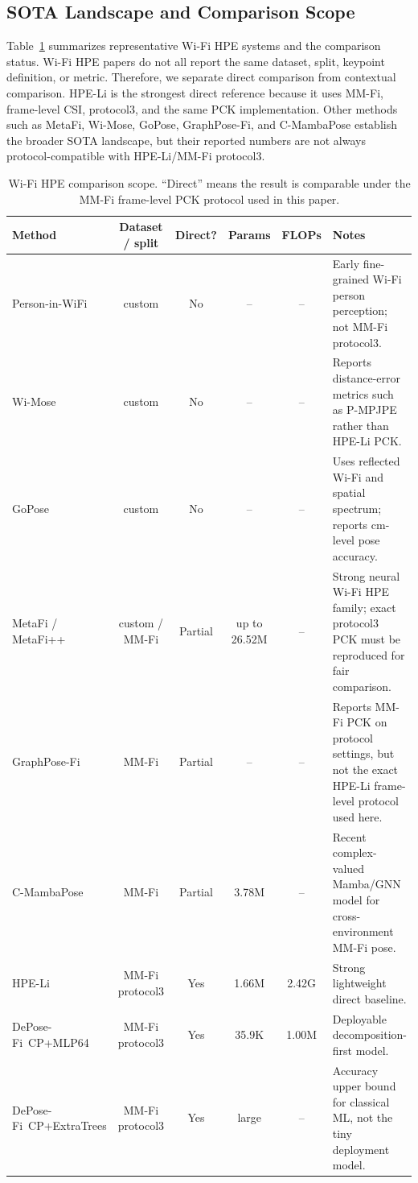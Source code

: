 \documentclass[letterpaper]{article}
\newcommand{\method}{DePose-Fi}
\begin{document}
\subsection{SOTA Landscape and Comparison Scope}

Table~\ref{tab:sota_scope} summarizes representative Wi-Fi HPE systems and the comparison status. Wi-Fi HPE papers do not all report the same dataset, split, keypoint definition, or metric. Therefore, we separate direct comparison from contextual comparison. HPE-Li is the strongest direct reference because it uses MM-Fi, frame-level CSI, protocol3, and the same PCK implementation. Other methods such as MetaFi, Wi-Mose, GoPose, GraphPose-Fi, and C-MambaPose establish the broader SOTA landscape, but their reported numbers are not always protocol-compatible with HPE-Li/MM-Fi protocol3.

\begin{table}[t]
\centering
\caption{Wi-Fi HPE comparison scope. ``Direct'' means the result is comparable under the MM-Fi frame-level PCK protocol used in this paper.}
\label{tab:sota_scope}
\begin{tabular}{lccccp{4.8cm}}
\toprule
Method & Dataset / split & Direct? & Params & FLOPs & Notes \\
\midrule
Person-in-WiFi & custom & No & -- & -- & Early fine-grained Wi-Fi person perception; not MM-Fi protocol3. \\
Wi-Mose & custom & No & -- & -- & Reports distance-error metrics such as P-MPJPE rather than HPE-Li PCK. \\
GoPose & custom & No & -- & -- & Uses reflected Wi-Fi and spatial spectrum; reports cm-level pose accuracy. \\
MetaFi / MetaFi++ & custom / MM-Fi & Partial & up to 26.52M & -- & Strong neural Wi-Fi HPE family; exact protocol3 PCK must be reproduced for fair comparison. \\
GraphPose-Fi & MM-Fi & Partial & -- & -- & Reports MM-Fi PCK on protocol settings, but not the exact HPE-Li frame-level protocol used here. \\
C-MambaPose & MM-Fi & Partial & 3.78M & -- & Recent complex-valued Mamba/GNN model for cross-environment MM-Fi pose. \\
HPE-Li & MM-Fi protocol3 & Yes & 1.66M & 2.42G & Strong lightweight direct baseline. \\
\method\ CP+MLP64 & MM-Fi protocol3 & Yes & 35.9K & 1.00M & Deployable decomposition-first model. \\
\method\ CP+ExtraTrees & MM-Fi protocol3 & Yes & large & -- & Accuracy upper bound for classical ML, not the tiny deployment model. \\
\bottomrule
\end{tabular}
\end{table}
\end{document}
